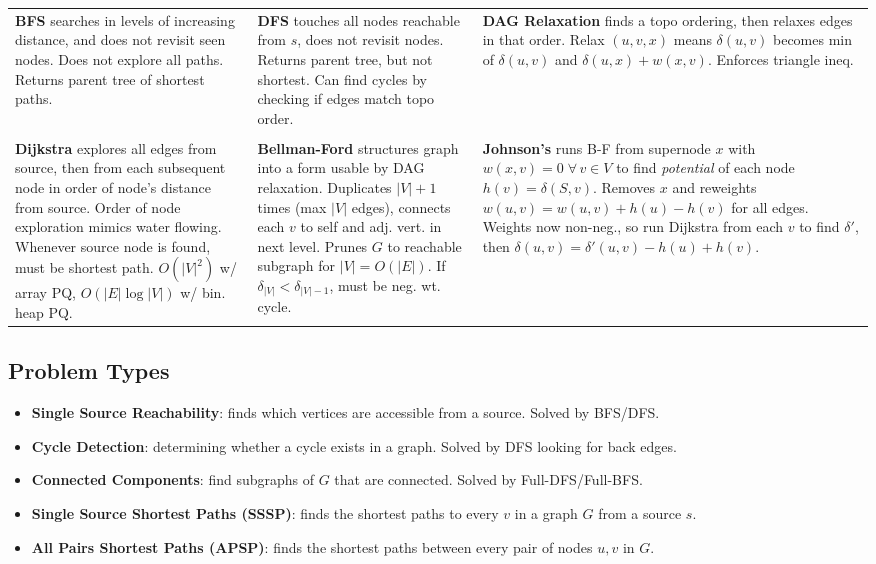\documentclass{article}
\begin{document}
\noindent\begin{tabularx}{\textwidth}{XXX}
    \textbf{BFS} searches in levels of increasing distance, and does not revisit seen nodes. Does not explore all paths. Returns parent tree of shortest paths. &
    \textbf{DFS} touches all nodes reachable from $s$, does not revisit nodes. Returns parent tree, but not shortest. Can find cycles by checking if edges match topo order.&
    \textbf{DAG Relaxation} finds a topo ordering, then relaxes edges in that order. Relax $(u,v,x)$ means $\delta(u,v)$ becomes min of $\delta(u,v)$ and $\delta(u,x) + w(x,v)$. Enforces triangle ineq. \\\\
    \textbf{Dijkstra} explores all edges from source, then from each subsequent node in order of node's distance from source. Order of node exploration mimics water flowing. Whenever source node is found, must be shortest path. $O(|V|^2)$ w/ array PQ, $O(|E|\log|V|)$ w/ bin. heap PQ.&
    \textbf{Bellman-Ford} structures graph into a form usable by DAG relaxation. Duplicates $|V|+1$ times (max $|V|$ edges), connects each $v$ to self and adj. vert. in next level. Prunes $G$ to reachable subgraph for $|V|=O(|E|)$. If $\delta_{|V|} < \delta_{|V|-1}$, must be neg. wt. cycle.&
    \textbf{Johnson's} runs B-F from supernode $x$ with $w(x,v) = 0\;\forall\, v \in V$ to find \emph{potential} of each node $h(v) = \delta(S,v)$. Removes $x$ and reweights $w(u,v) = w(u,v) + h(u) - h(v)$ for all edges. Weights now non-neg., so run Dijkstra from each $v$ to find $\delta '$, then $\delta(u,v) = \delta'(u,v) - h(u)+h(v)$. \\
\end{tabularx}

\subsection{Problem Types}
\begin{itemize}[noitemsep]
    \item \textbf{Single Source Reachability}: finds which vertices are accessible from a source. Solved by BFS/DFS.
    \item \textbf{Cycle Detection}: determining whether a cycle exists in a graph. Solved by DFS looking for back edges.
    \item \textbf{Connected Components}: find subgraphs of $G$ that are connected. Solved by Full-DFS/Full-BFS.
    \item \textbf{Single Source Shortest Paths (SSSP)}: finds the shortest paths to every $v$ in a graph $G$ from a source $s$.
    \item \textbf{All Pairs Shortest Paths (APSP)}: finds the shortest paths between every pair of nodes $u,v$ in $G$.
\end{itemize}
\end{document}
